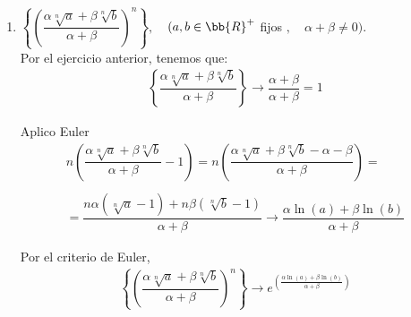 \documentclass[12pt]{article}
\begin{document}
\begin{ejercicio}[3 puntos]
\begin{enumerate}
            \item $\left\{ \left( \dfrac{\alpha \sqrt[n]{a} + \beta \sqrt[n]{b}}{\alpha + \beta}\right)^n \right\}, \,\,$ $\,\, (a,b\in \bb{R}^+$ fijos $, \,\,$ $\,\, \alpha + \beta \neq 0)$.\\

            Por el ejercicio anterior, tenemos que: 
            \begin{gather*}
                \left\{ \dfrac{\alpha \sqrt[n]{a} + \beta \sqrt[n]{b}}{\alpha + \beta}\right\} \longrightarrow \dfrac{\alpha + \beta}{\alpha + \beta} = 1
            \end{gather*}

            Aplico Euler
            \begin{gather*}
                n\left( \dfrac{\alpha \sqrt[n]{a} + \beta \sqrt[n]{b}}{\alpha + \beta} -1\right) = n\left( \dfrac{\alpha \sqrt[n]{a} + \beta \sqrt[n]{b} - \alpha - \beta}{\alpha + \beta} \right) =\\\\
                = \dfrac{n\alpha (\sqrt[n]{a} -1) + n \beta (\sqrt[n]{b} -1) }{\alpha + \beta} \longrightarrow \dfrac{\alpha \ln(a) + \beta \ln(b)}{\alpha + \beta}
            \end{gather*}

            Por el criterio de Euler,
            \begin{gather*}
                \left\{ \left( \dfrac{\alpha \sqrt[n]{a} + \beta \sqrt[n]{b}}{\alpha + \beta}\right)^n \right\} \longrightarrow e^{\left(\frac{\alpha \ln(a) + \beta \ln(b)}{\alpha + \beta}\right)}
            \end{gather*}
            
        \end{enumerate}
    \end{ejercicio}
\end{document}
